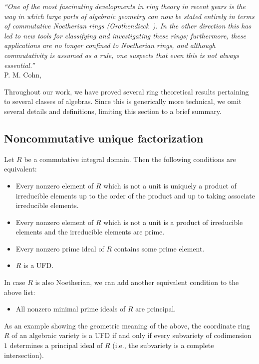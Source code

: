 \documentclass{commat}
\begin{document}
\begin{flushright}{\it
		``One of the most fascinating developments in ring theory in recent
		years is the way in which large parts of algebraic geometry can now be stated entirely
		in terms of commutative Noetherian rings (Grothendieck~\cite{aG60}). In the other direction this has led
		to new tools for classifying and investigating these rings; furthermore, these applications are no longer confined to Noetherian rings, and although commutativity
		is assumed as a rule, one suspects that even this is not always essential.''} \\
	P. M. Cohn, \cite[Introduction]{pC73}
\end{flushright}

Throughout our work, we have proved several ring theoretical results pertaining to several classes of algebras. Since this is generically more technical, we omit several details and definitions, limiting this section to a brief summary.

\subsection{Noncommutative unique factorization}\label{SS:rt:fact}

Let $R$ be a commutative integral domain. Then the following conditions are equivalent:
\begin{itemize}
	\item Every nonzero element of $R$ which is not a unit is uniquely a product of irreducible elements up to the order of the product and up to taking associate irreducible elements.
	
	\item Every nonzero element of $R$ which is not a unit is a product of irreducible elements and the irreducible elements are prime.
	
	\item Every nonzero prime ideal of $R$ contains some prime element.
	
	\item $R$ is a UFD.
\end{itemize}
%
In case $R$ is also Noetherian, we can add another equivalent condition to the above list:
\begin{itemize}
	\item All nonzero minimal prime ideals of $R$ are principal.
\end{itemize}

As an example showing the geometric meaning of the above, the coordinate ring $R$ of an algebraic variety is a UFD if and only if every subvariety of codimension $1$ determines a principal ideal of $R$ (i.e., the subvariety is a complete intersection).
\end{document}
